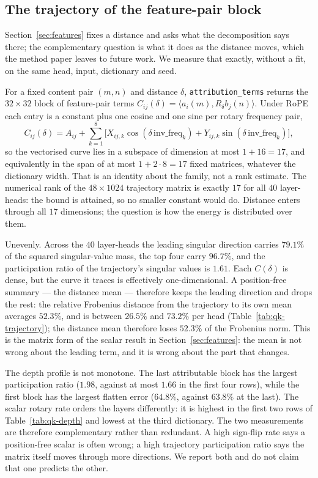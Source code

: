\documentclass{article}
\theoremstyle{plain}
\theoremstyle{remark}
\newcommand{\invf}{\mathrm{inv\_freq}}
\begin{document}
\subsection{The trajectory of the feature-pair block}
\label{app:qktraj}

Section~\ref{sec:features} fixes a distance and asks what the decomposition says
there; the complementary question is what it does as the distance moves, which
the method paper leaves to future work. We measure that exactly, without a fit,
on the same head, input, dictionary and seed.

For a fixed content pair $(m,n)$ and distance $\delta$,
\texttt{attribution\_terms} returns the $32\times32$ block of feature-pair terms
$C_{ij}(\delta)=\langle a_i(m),R_\delta b_j(n)\rangle$. Under RoPE each entry is
a constant plus one cosine and one sine per rotary frequency pair,
\begin{equation}
  C_{ij}(\delta) = A_{ij} + \sum_{k=1}^{8}
  \bigl[X_{ij,k}\cos(\delta\,\invf_k) + Y_{ij,k}\sin(\delta\,\invf_k)\bigr],
\end{equation}
so the vectorised curve lies in a subspace of dimension at most $1+16=17$, and
equivalently in the span of at most $1+2\cdot8=17$ fixed matrices, whatever the
dictionary width. That is an identity about the family,
not a rank estimate. The numerical rank of the $48\times1024$ trajectory matrix
is exactly $17$ for all $40$ layer-heads: the bound is attained, so no smaller
constant would do. Distance enters through all $17$ dimensions; the question is
how the energy is distributed over them.

Unevenly. Across the $40$ layer-heads the leading singular direction carries
$79.1\%$ of the squared singular-value mass, the top four carry $96.7\%$, and
the participation ratio of the trajectory's singular values is $1.61$. Each
$C(\delta)$ is dense, but the curve it traces is effectively one-dimensional.
A position-free summary --- the distance mean --- therefore keeps the leading
direction and drops the rest: the relative Frobenius distance from the
trajectory to its own mean averages $52.3\%$, and is between $26.5\%$ and
$73.2\%$ per head (Table~\ref{tab:qk-trajectory}); the distance mean therefore
loses $52.3\%$ of the Frobenius norm. This is the matrix form of
the scalar result in Section~\ref{sec:features}: the mean is not wrong about the
leading term, and it is wrong about the part that changes.

The depth profile is not monotone. The last attributable block has the largest
participation ratio ($1.98$, against at most $1.66$ in the first four rows),
while the first block has the largest flatten error ($64.8\%$, against $63.8\%$
at the last). The scalar rotary rate orders the layers differently: it is
highest in the first two rows of Table~\ref{tab:qk-depth} and lowest at the
third dictionary. The two measurements are therefore complementary rather than
redundant. A high sign-flip rate says a position-free scalar is often wrong; a
high trajectory participation ratio says the matrix itself moves through more
directions. We report both and do not claim that one predicts the other.
\end{document}

